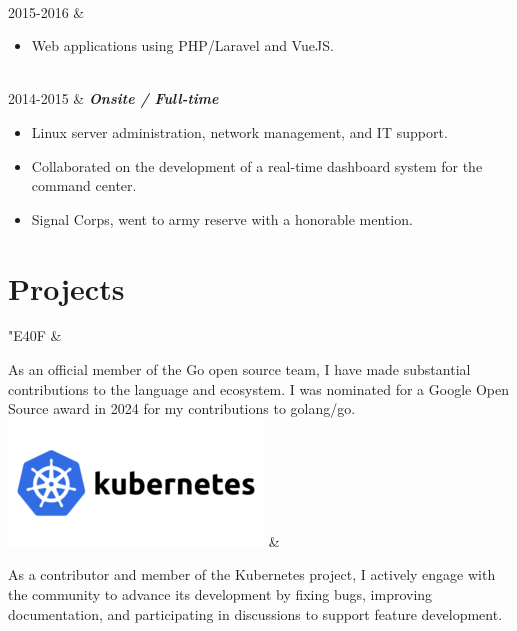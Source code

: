 \documentclass[]{cv-mauri}
\begin{document}
\begin{tabularcv}
		    \\[\vspacepar]
    2015-2016   &   
            \begin{itemize}
                  	\item Web applications using PHP/Laravel and VueJS.
            \end{itemize}

                    \\[\vspacepar]
	2014-2015   &   
					\textbf{\textit{Onsite / Full-time}}

			\begin{itemize}
				\item Linux server administration, network management, and IT support.
				\item Collaborated on the development of a real-time dashboard system for the command center.
				\item Signal Corps, went to army reserve with a honorable mention.
			\end{itemize}
\end{tabularcv}

\section*{Projects}
\begin{tabularcv}
	{\Huge \color[HTML]{76E1FE} \FAB \char"E40F} &

		As an official member of the Go open source team, I have made substantial contributions to the language and ecosystem.
		I was nominated for a Google Open Source award in 2024 for my contributions to golang/go.
	\\
	\includegraphics[scale=1.5]{images/k8s.png} &

	As a contributor and member of the Kubernetes project, I actively
	engage with the community to advance its development by fixing bugs,
	improving documentation, and participating in discussions to support
	feature development.
\end{tabularcv}
\end{document}
